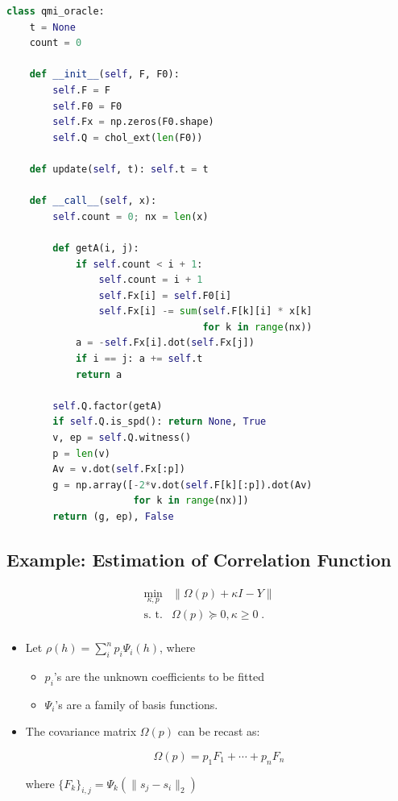 \documentclass[]{article}
\providecommand{\tightlist}{%
  \setlength{\itemsep}{0pt}\setlength{\parskip}{0pt}}
\begin{document}
\scriptsize

\begin{lstlisting}[language=Python]
class qmi_oracle:
    t = None
    count = 0

    def __init__(self, F, F0):
        self.F = F
        self.F0 = F0
        self.Fx = np.zeros(F0.shape)
        self.Q = chol_ext(len(F0))

    def update(self, t): self.t = t

    def __call__(self, x):
        self.count = 0; nx = len(x)

        def getA(i, j):
            if self.count < i + 1:
                self.count = i + 1
                self.Fx[i] = self.F0[i]
                self.Fx[i] -= sum(self.F[k][i] * x[k]
                                  for k in range(nx))
            a = -self.Fx[i].dot(self.Fx[j])
            if i == j: a += self.t
            return a

        self.Q.factor(getA)
        if self.Q.is_spd(): return None, True
        v, ep = self.Q.witness()
        p = len(v)
        Av = v.dot(self.Fx[:p])
        g = np.array([-2*v.dot(self.F[k][:p]).dot(Av)
                      for k in range(nx)])
        return (g, ep), False
\end{lstlisting}

\hypertarget{example-estimation-of-correlation-function}{%
\subsection{Example: Estimation of Correlation
Function}\label{example-estimation-of-correlation-function}}

\[\begin{array}{ll}
   \min_{\kappa, p}   & \| \Omega(p) + \kappa I - Y \| \\
   \text{s. t.} & \Omega(p) \succcurlyeq 0,  \kappa \geq 0 \; .\\
 \end{array}\]

\begin{itemize}
\item
  Let \(\rho(h) = \sum_i^n p_i \Psi_i(h)\), where

  \begin{itemize}
  \tightlist
  \item
    \(p_i\)'s are the unknown coefficients to be fitted
  \item
    \(\Psi_i\)'s are a family of basis functions.
  \end{itemize}
\item
  The covariance matrix \(\Omega(p)\) can be recast as:

  \[\Omega(p) = p_1 F_1 + \cdots + p_n F_n\]

  where \(\{F_k\}_{i,j} =\Psi_k( \| s_j - s_i \|_2)\)
\end{itemize}
\end{document}
